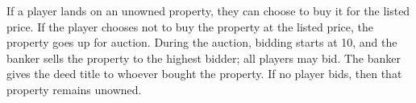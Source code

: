 If a player lands on an unowned property, they can choose to buy it for the listed price. If the player chooses not to buy the property at the listed price, the property goes up for auction. During the auction, bidding starts at 10, and the banker sells the property to the highest bidder; all players may bid. The banker gives the deed title to whoever bought the property. If no player bids, then that property remains unowned.